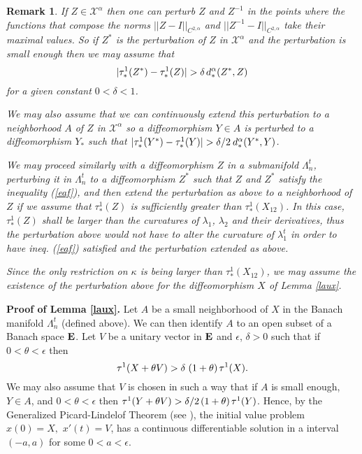 \documentclass{article}
\newtheorem{remark}{Remark}[section]
\begin{document}
\begin{remark} If $Z\in \mathcal X^\alpha$ then one can perturb $Z$ and $Z^{-1}$ in the points where the functions that compose the norms $||Z-I||_{C^{2,\alpha}}$ and $||Z^{-1}-I||_{C^{2,\alpha}}$ take their maximal values. So if  $Z^*$ is the  perturbation of $Z$ in $\mathcal X^\alpha$ and the perturbation is small enough then we may assume that 
\begin{equation}\label{eaf}
|\tau^1_*(Z^*)-\tau^1_*(Z)|>\delta\hspace{.02in} d^\alpha_*(Z^*,Z) 
\end{equation}
for a given constant $0<\delta<1$. 

We may also assume that we can continuously extend this perturbation to a neighborhood $A$ of $Z$ in $\mathcal X^\alpha$ so a diffeomorphism $Y\in A$ is perturbed to a diffeomorphism $Y_*$ such that $|\tau^1_*(Y^*)-\tau^1_*(Y)|>\delta/2\hspace{.03in} d^\alpha_*(Y^*,Y)$.

We may proceed similarly with a diffeomorphism $Z$ in a submanifold $\Lambda_n^t$, perturbing it in $\Lambda_n^t$
to a diffeomorphism $Z^*$ such that $Z$ and $Z^*$ satisfy the inequality (\ref{eaf}), and then extend the perturbation as above to a neighborhood of $Z$ if we assume that $\tau^1_*(Z)$ is sufficiently greater than
$\tau^1_*(X_{12})$. In this case, $\tau^1_*(Z)$ shall be  larger than the curvatures of $\lambda_1$, $\lambda_2$ and their derivatives, thus the perturbation above would not have to  alter the curvature of $\lambda_1^t$ in order to have ineq. (\ref{eaf}) satisfied and the perturbation extended as above.

Since the only restriction on $\kappa$ is being larger than $\tau^1_*(X_{12})$,  we may assume the existence of the perturbation above for the diffeomorphism $X$ of Lemma \ref{laux}.
\end{remark}

\noindent
{\bf Proof of Lemma \ref{laux}.} Let $A$ be a small neighborhood of $X$ in the Banach manifold $\Lambda_n^t$ (defined above). We can then identify $A$ to an open subset of a  Banach space $\bf E$. Let $V$ be a unitary vector in $\bf E$ and $\epsilon$, $\delta>0$ 
such that if $0<\theta<\epsilon$ then $$\tau^1(X+\theta V)>\delta\hspace{.04in}(1+\theta)\hspace{.02in}\tau^1(X).$$
We may also assume that $V$ is chosen in such a way that if $A$ is small enough, $Y\in A$, and $0<\theta<\epsilon$ then $\tau^1(Y+\theta V)>\delta/2\hspace{.02in}(1+\theta)\hspace{.02in}\tau^1(Y)$. Hence, by the Generalized Picard-Lindelof Theorem (see \cite[p. 78, Theorem 3.A]{zd}), the initial value problem $x(0)=X,$ $x'(t)=V$, has a continuous differentiable solution in a interval $(-a,a)$ for some $0<a<\epsilon$.
\end{document}
